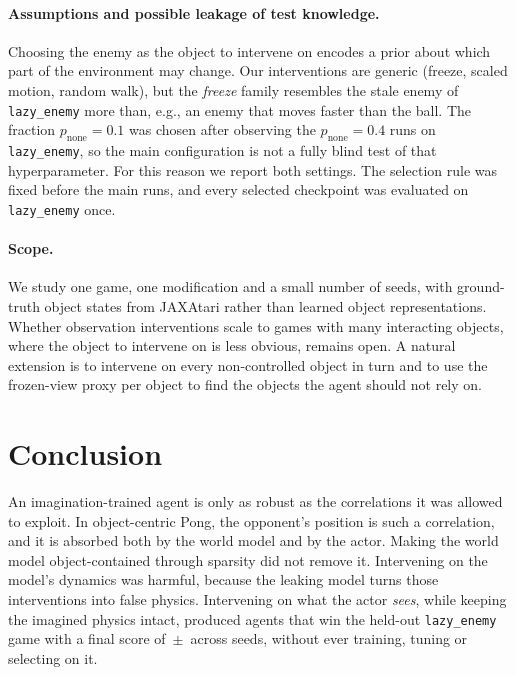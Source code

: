 \documentclass{article}
\makeatletter
\newcommand{\lazy}{\texttt{lazy\_enemy}}
\newcommand{\eg}{e.g.\@\xspace}
\makeatother
\begin{document}
\paragraph{Assumptions and possible leakage of test knowledge.} Choosing the enemy as the object to
intervene on encodes a prior about which part of the environment may change. Our interventions are
generic (freeze, scaled motion, random walk), but the \emph{freeze} family resembles the stale enemy of
\lazy{} more than, \eg, an enemy that moves faster than the ball. The fraction $p_{\text{none}}=0.1$
was chosen after observing the $p_{\text{none}}=0.4$ runs on \lazy{}, so the main configuration is not
a fully blind test of that hyperparameter. For this reason we report both settings. The selection rule
was fixed before the main runs, and every selected checkpoint was evaluated on \lazy{} once.

\paragraph{Scope.} We study one game, one modification and a small number of seeds, with
ground-truth object states from JAXAtari rather than learned object representations. Whether
observation interventions scale to games with many interacting objects, where the object to intervene
on is less obvious, remains open. A natural extension is to intervene on every non-controlled object
in turn and to use the frozen-view proxy per object to find the objects the agent should not rely on.

\section{Conclusion}

An imagination-trained agent is only as robust as the correlations it was allowed to exploit. In
object-centric Pong, the opponent's position is such a correlation, and it is absorbed both by the
world model and by the actor. Making the world model object-contained through sparsity did not remove
it. Intervening on the model's dynamics was harmful, because the leaking model turns those
interventions into false physics. Intervening on what the actor \emph{sees}, while keeping the imagined
physics intact, produced agents that win the held-out \lazy{} game with a final score of
\OursLazy{}\,$\pm$\,\OursLazyStd{} across \OursSeeds{} seeds, without ever training, tuning or selecting
on it.
\end{document}
